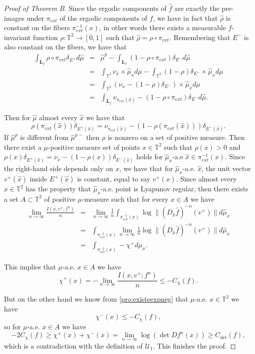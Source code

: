 \documentclass[11pt,letterpaper,reqno]{article}
\newcommand{\TT}{\mathbb{T}^2}
\newcommand{\hTTf}[1][f]{\mathbf{L}_{#1}}
\newcommand{\hmu}{\hat{\mu}}
\begin{document}
\begin{proof}[Proof of Theorem B]
Since the ergodic components of $\hat f$ are exactly the pre-images under $\pi_{ext}$ of the ergodic components of $f$, we have in fact that $\hat\rho$ is constant on the fibers $\pi_{ext}^{-1}(x)$, in other words there exists a measurable $f$-invariant function $\rho:\mathbb T^2\rightarrow[0,1]$ such that $\hat\rho=\rho\circ\pi_{ext}$. Remembering that $E^-$ is also constant on the fibers, we have that
\begin{eqnarray*}
\int_{\hTTf}\rho\circ\pi_{ext}\delta_{E^+}d\hat\mu&=&\hat\mu^p-\int_{\hTTf}(1-\rho\circ\pi_{ext})\delta_{E^-}d\hat\mu\\
&=&\int_{\mathbb T^2}\nu_x\times\hmu_xd\mu-\int_{\mathbb T^2}(1-\rho)\delta_{E^-}\times\hmu_xd\mu\\
&=&\int_{\mathbb T^2}\left(\nu_x-(1-\rho)\delta_{E^-}\right)\times\hmu_xd\mu\\
&=&\int_{\hTTf}\nu_{\pi_{ext}(\hat x)}-(1-\rho\circ\pi_{ext})\delta_{E^-}d\hat\mu.
\end{eqnarray*}

Then for $\hat\mu$ almost every $\hat x$ we have that 
\[\rho(\pi_{ext}(\hat x))\delta_{E^+(\hat x)}=\nu_{\pi_{ext}(\hat x)}-(1-\rho(\pi_{ext}(\hat x)))\delta_{E^-(\hat x)}.
\]
If $\hat\mu^p$ is different from $\hat\mu^{p-}$ then $\rho$ is nonzero on a set of positive measure. Then there exist a $\mu$-positive measure set of points $x\in\mathbb T^2$ such that $\rho(x)>0$ and $\rho(x)\delta_{E^+(\hat x)}=\nu_{x}-(1-\rho(x))\delta_{E^-(\hat x)}$ holds for $\hmu_x$-a.e $\hat x\in\pi_{ext}^{-1}(x)$. Since the right-hand side depends only on $x$, we have that for $\hmu_x$-a.e. $\hat x$, the unit vector $v^+(\hat x)$ inside $E^+(\hat x)$ is constant, equal to say $v^+(x)$. Since almost every $x\in\TT$ has the property that $\hmu_x$-a.e. point is Lyapunov regular, then there exists a set $A\subset\TT$ of positive $\mu$-measure such that for every $x\in A$ we have
\begin{eqnarray*}
\lim_{n\rightarrow\infty}\frac {I(x,v^+;f^n)}n&=&\lim_{n\rightarrow\infty}\frac 1n\int_{\pi_{ext}^{-1}(x)}\log\|(D_{\hat x}\hat f)^{-n}(v^+)\|d\hmu_x\\
&=&\int_{\pi_{ext}^{-1}(x)}\lim_{n\rightarrow\infty}\frac 1n\log\|(D_{\hat x}\hat f)^{-n}(v^+)\|d\hmu_x\\
&=&\int_{\pi_{ext}^{-1}(x)}-\chi^+d\hmu_x.
\end{eqnarray*}

This implies that $\mu$-a.e. $x\in A$ we have $$\chi^+(x)=-\lim_{n\rightarrow\infty}\frac {I(x,v^+;f^n)}n\leq -C_{\chi}(f).$$

But on the other hand we know from \ref{pro:existeexpneg} that $\mu$-a.e. $x\in\TT$ we have
$$
\chi^-(x)\leq-C_{\chi}(f),
$$
so for $\mu$-a.e. $x\in A$ we have
$$
-2C_{\chi}(f)\geq\chi^+(x)+\chi^-(x)=\lim_{n\rightarrow\infty}\log(\det Df^n(x))\geq C_{\det}(f),
$$
which is a contradiction with the definition of $\mathcal U_1$. This finishes the proof.
\end{proof}
\end{document}
